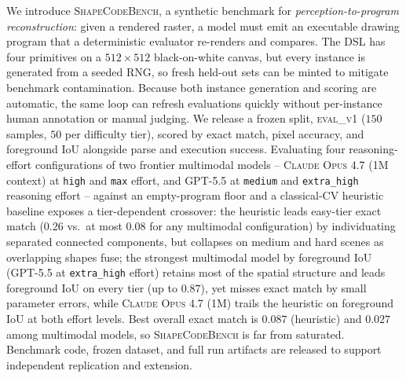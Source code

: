 We introduce \textsc{ShapeCodeBench}, a synthetic benchmark for \emph{perception-to-program
reconstruction}: given a rendered raster, a model must emit an executable drawing
program that a deterministic evaluator re-renders and compares. The DSL has four
primitives on a $512 \times 512$ black-on-white canvas, but every instance is
generated from a seeded RNG, so fresh held-out sets can be minted to mitigate
benchmark contamination. Because both instance generation and scoring are
automatic, the same loop can refresh evaluations quickly without per-instance
human annotation or manual judging. We release a frozen split,
\textsc{eval\_v1} ($150$ samples, $50$ per difficulty tier), scored by exact
match, pixel accuracy, and foreground IoU alongside parse and execution
success. Evaluating four
reasoning-effort configurations of two frontier multimodal models -- \textsc{Claude
Opus 4.7} (1M context) at \texttt{high} and \texttt{max} effort, and
\textsc{GPT-5.5} at \texttt{medium} and \texttt{extra\_high} reasoning effort --
against an empty-program floor and a classical-CV heuristic baseline exposes a
tier-dependent crossover: the heuristic leads easy-tier exact match ($0.26$ vs.\
at most $0.08$ for any multimodal configuration) by individuating separated
connected components, but collapses on medium and hard scenes as overlapping
shapes fuse; the strongest multimodal model by foreground IoU (\textsc{GPT-5.5}
at \texttt{extra\_high} effort) retains most of the spatial structure and leads
foreground IoU on every tier (up to $0.87$), yet misses exact match by small
parameter errors, while \textsc{Claude Opus 4.7} (1M) trails the heuristic on
foreground IoU at both effort levels. Best overall exact match is $0.087$
(heuristic) and $0.027$ among multimodal models, so
\textsc{ShapeCodeBench} is far from saturated. Benchmark code, frozen dataset, and full
run artifacts are released to support independent replication and extension.
